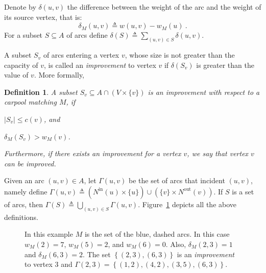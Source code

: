 \documentclass[11pt]{article}
\newtheorem{definition}{Definition}
\newcommand{\set}[1]{\left\{ #1 \right\}}
\newcommand{\abs}[1]{\left| #1 \right|}
\newcommand{\eqdf}{\triangleq}
\newcommand{\nin}[1][M]{N^{\text{in}}_{#1}}
\newcommand{\nout}[1][M]{N^{\text{out}}_{#1}}
\newcommand{\inc}{\Gamma}
\begin{document}
Denote by $\delta(u,v)$ the difference between the weight of the arc
and the weight of its source vertex, that is:
\[
\delta_M(u, v) \eqdf w(u, v) - w_M(u)
~.
\]
For a subset $S \subseteq A$ of arcs define
$\delta(S) \eqdf \sum_{(u,v) \in S} \delta(u,v)$.

A subset $S_v$ of arcs entering a vertex $v$, whose size is not
greater than the capacity of $v$, is called an \emph{improvement} to
vertex $v$ if $\delta(S_v)$ is greater than the value of $v$.  More
formally, 

\begin{definition}
A subset $S_v \subseteq A \cap (V \times \{v\})$ is
an \emph{improvement} with respect to a carpool matching $M$, if%
\begin{inparaenum}[(i)]
\item $\abs{S_v} \leq c(v)$, and
\item $\delta_M(S_v) > w_M(v)$.
\end{inparaenum}
Furthermore, if there exists an improvement for a vertex $v$, we say
that vertex $v$ can be \emph{improved}.
\end{definition}

Given an arc $(u,v) \in A$, let $\inc(u,v)$ be the set of arcs that
incident $(u, v)$, namely define
\(
\inc(u,v) \eqdf (\nin[](u) \times \{u\}) \cup (\{v\} \times \nout[](v))
\).
If $S$ is a set of arcs, then $\inc(S) \eqdf \bigcup_{(u,v) \in
S} \inc(u,v)$.
%
Figure~\ref{fig:defs} depicts all the above definitions.

\begin{figure}[t]
\centering
{}
\caption{In this example $M$ is the set of the blue, dashed arcs.
In this case $w_M(2) = 7$, $w_M(5) = 2$, and $w_M(6) = 0$.  Also,
$\delta_M(2, 3) = 1$ and $\delta_M(6, 3) = 2$.  The set $\set{(2,3),
(6,3)}$ is an \emph{improvement} to vertex 3 and $\inc(2,3)
= \set{(1,2),(4,2),(3,5),(6,3)}$.}
\label{fig:defs}
\end{figure}
\end{document}
